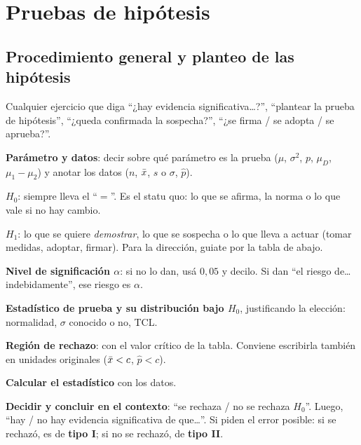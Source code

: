 \newpage
\section{Pruebas de hipótesis}

\subsection{Procedimiento general y planteo de las hipótesis}\label{p:general}
\begin{cuando}
Cualquier ejercicio que diga ``¿hay evidencia significativa\ldots?'', ``plantear la prueba de hipótesis'', ``¿queda confirmada la sospecha?'', ``¿se firma / se adopta / se aprueba?''.
\end{cuando}
\begin{pasos}
\begin{pasolista}
\item \textbf{Parámetro y datos}: decir sobre qué parámetro es la prueba ($\mu$, $\sigma^2$, $p$, $\mu_D$, $\mu_1-\mu_2$) y anotar los datos ($n$, $\bar{x}$, $s$ o $\sigma$, $\hat p$).
\item \textbf{$H_0$}: siempre lleva el ``$=$''. Es el statu quo: lo que se afirma, la norma o lo que vale si no hay cambio.
\item \textbf{$H_1$}: lo que se quiere \emph{demostrar}, lo que se sospecha o lo que lleva a actuar (tomar medidas, adoptar, firmar). Para la dirección, guiate por la tabla de abajo.
\item \textbf{Nivel de significación $\alpha$}: si no lo dan, usá $0{,}05$ y decilo. Si dan ``el riesgo de\ldots indebidamente'', ese riesgo es $\alpha$.
\item \textbf{Estadístico de prueba y su distribución bajo $H_0$}, justificando la elección: normalidad, $\sigma$ conocido o no, TCL.
\item \textbf{Región de rechazo}: con el valor crítico de la tabla. Conviene escribirla también en unidades originales ($\bar{x}<c$, $\hat p<c$).
\item \textbf{Calcular el estadístico} con los datos.
\item \textbf{Decidir y concluir en el contexto}: ``se rechaza / no se rechaza $H_0$''. Luego, ``hay / no hay evidencia significativa de que\ldots''. Si piden el error posible: si se rechazó, es de \textbf{tipo I}; si no se rechazó, de \textbf{tipo II}.
\end{pasolista}
\end{pasos}
